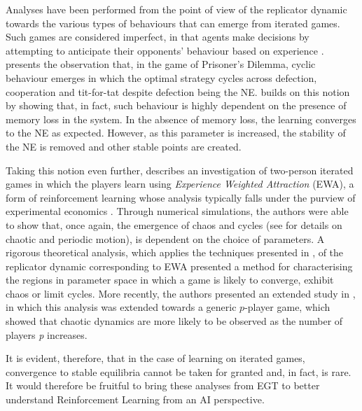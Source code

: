 \documentclass[sigconf,anonymous]{aamas}
\begin{document}
Analyses have been performed from the point of view of the replicator dynamic towards the various types of behaviours that can emerge from iterated games. Such games are considered imperfect, in that agents make decisions by attempting to anticipate their opponents' behaviour based on experience \cite{Galla2011}. \cite{Imhof2005} presents the observation that, in the game of Prisoner's Dilemma, cyclic behaviour emerges in which the optimal strategy cycles across defection, cooperation and tit-for-tat despite defection being the NE. \cite{Galla2011} builds on this notion by showing that, in fact, such behaviour is highly dependent on the presence of memory loss in the system. In the absence of memory loss, the learning converges to the NE as expected. However, as this parameter is increased, the stability of the NE is removed and other stable points are created. 

Taking this notion even further,  \cite{Galla2013} describes an investigation of two-person iterated games in which the players learn using \textit{Experience Weighted Attraction} (EWA), a form of reinforcement learning whose analysis typically falls under the purview of experimental economics \cite{Camerer2009}. Through numerical simulations, the authors were able to show that, once again, the emergence of chaos and cycles (see \cite{Strogatz2000} for details on chaotic and periodic motion), is dependent on the choice of parameters. A rigorous theoretical analysis, which applies the techniques presented in \cite{Opper1992}, of the replicator dynamic corresponding to EWA presented a method for characterising the regions in parameter space in which a game is likely to converge, exhibit chaos or limit cycles. More recently, the authors presented an extended study in \cite{Sanders2018}, in which this analysis was extended towards a generic $p$-player game, which showed that chaotic dynamics are more likely to be observed as the number of players \textit{p} increases.

It is evident, therefore, that in the case of learning on iterated games, convergence to stable equilibria cannot be taken for granted and, in fact, is rare. It would therefore be fruitful to bring these analyses from EGT to better understand Reinforcement Learning from an AI perspective.
\end{document}
